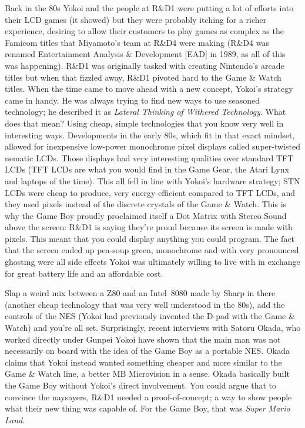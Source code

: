 \documentclass{book}
\begin{document}
Back in the 80s Yokoi and the people at R\&D1 were putting a lot of efforts into their LCD games (it showed) but they were probably itching for a richer experience, desiring to allow their customers to play games as complex as the Famicom titles that Miyamoto’s team at R\&D4 were making (R\&D4 was renamed Entertainment Analysis \& Development [EAD] in 1989, as all of this was happening). R\&D1 was originally tasked with creating Nintendo’s arcade titles but when that fizzled away, R\&D1 pivoted hard to the Game \& Watch titles. When the time came to move ahead with a new concept, Yokoi’s strategy came in handy. He was always trying to find new ways to use seasoned technology; he described it as \emph{Lateral Thinking of Withered Technology}. What does that mean? Using cheap, simple technologies that you know very well in interesting ways. Developments in the early 80s, which fit in that exact mindset, allowed for inexpensive low-power monochrome pixel displays called super-twisted nematic LCDs. Those displays had very interesting qualities over standard TFT LCDs (TFT LCDs are what you would find in the Game Gear, the Atari Lynx and laptops of the time). This all fell in line with Yokoi’s hardware strategy; STN LCDs were cheap to produce, very energy-efficient compared to TFT LCDs, and they used pixels instead of the discrete crystals of the Game \& Watch. This is why the Game Boy proudly proclaimed itself a Dot Matrix with Stereo Sound above the screen: R\&D1 is saying they’re proud because its screen is made with pixels. This meant that you could display anything you could program. The fact that the screen ended up pea-soup green, monochrome and with very pronounced ghosting were all side effects Yokoi was ultimately willing to live with in exchange for great battery life and an affordable cost.

Slap a weird mix between a Z80 and an Intel 8080 made by Sharp in there (another cheap technology that was very well understood in the 80s), add the controls of the NES (Yokoi had previously invented the D-pad with the Game \& Watch) and you’re all set. Surprisingly, recent interviews with Satoru Okada, who worked directly under Gunpei Yokoi have shown that the main man was not necessarily on board with the idea of the Game Boy as a portable NES. Okada claims that Yokoi instead wanted something cheaper and more similar to the Game \& Watch line, a better MB Microvision in a sense. Okada basically built the Game Boy without Yokoi’s direct involvement. You could argue that to convince the naysayers, R\&D1 needed a proof-of-concept; a way to show people what their new thing was capable of. For the Game Boy, that was \emph{Super Mario Land}.
\end{document}
